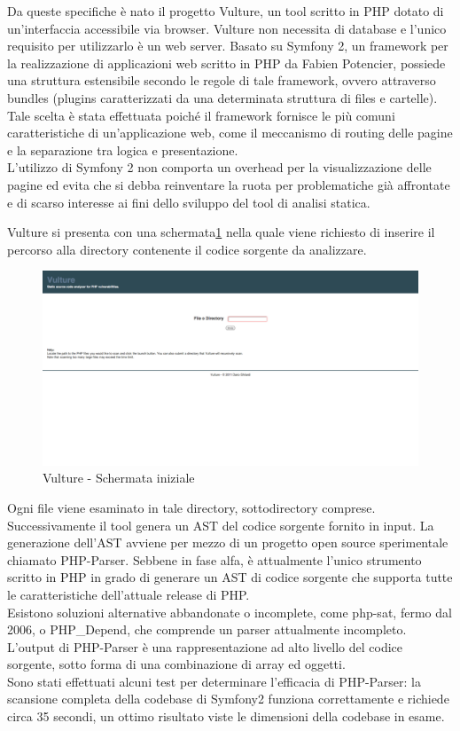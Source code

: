 Da queste specifiche è nato il progetto Vulture, un tool scritto in PHP dotato di un'interfaccia accessibile via browser. Vulture non necessita di database e l'unico requisito per utilizzarlo è un web server. Basato su Symfony 2\cite{symfony}, un framework per la realizzazione di applicazioni web scritto in PHP da Fabien Potencier, possiede una struttura estensibile secondo le regole di tale framework, ovvero attraverso bundles (plugins caratterizzati da una determinata struttura di files e cartelle). Tale scelta è stata effettuata poiché il framework fornisce le più comuni caratteristiche di un'applicazione web, come il meccanismo di routing delle pagine e la separazione tra logica e presentazione.\\
L'utilizzo di Symfony 2 non comporta un overhead per la visualizzazione delle pagine ed evita che si debba reinventare la ruota per problematiche già affrontate e di scarso interesse ai fini dello sviluppo del tool di analisi statica.

Vulture si presenta con una schermata\ref{vultureinizio} nella quale viene richiesto di inserire il percorso alla directory contenente il codice sorgente da analizzare. 

\begin{figure}[!h]
\centering
\includegraphics[width=16cm]{Vulture.png}
\caption{Vulture - Schermata iniziale}\label{vultureinizio}
\end{figure}

Ogni file viene esaminato in tale directory, sottodirectory comprese.\\
Successivamente il tool genera un AST del codice sorgente fornito in input. La generazione dell'AST avviene per mezzo di un progetto open source sperimentale chiamato PHP-Parser\cite{phpparser}. Sebbene in fase alfa, è attualmente l'unico strumento scritto in PHP in grado di generare un AST di codice sorgente che supporta tutte le caratteristiche dell'attuale release di PHP. \\
Esistono soluzioni alternative abbandonate o incomplete, come php-sat\cite{phpsat}, fermo dal 2006, o PHP\_Depend\cite{phpdepend}, che comprende un parser attualmente incompleto.
L'output di PHP-Parser è una rappresentazione ad alto livello del codice sorgente, sotto forma di una combinazione di array ed oggetti. \\
Sono stati effettuati alcuni test per determinare l'efficacia di PHP-Parser: la scansione completa della codebase di Symfony2 funziona correttamente e richiede circa 35 secondi, un ottimo risultato viste le dimensioni della codebase in esame.\\

